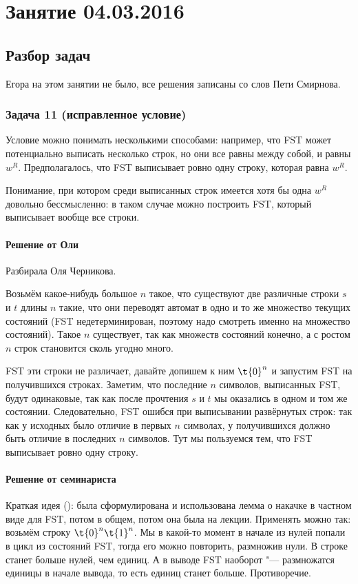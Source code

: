 \chapter{Занятие 04.03.2016}
\section{Разбор задач}

Егора на этом занятии не было, все решения записаны со слов Пети Смирнова.

\subsection{Задача 11 (исправленное условие)}\label{prob11hard}
	\begin{Rem}
		Условие можно понимать несколькими способами: например, что FST может потенциально выписать 
		несколько строк, но они все равны между собой, и равны $w^R$.
		Предполагалось, что FST выписывает ровно одну строку, которая равна $w^R$.

		Понимание, при котором среди выписанных строк имеется хотя бы одна $w^R$ довольно бессмысленно:
		в таком случае можно построить FST, который выписывает вообще все строки.
	\end{Rem}

	\subsubsection{Решение от Оли}
		Разбирала Оля Черникова.

		Возьмём какое-нибудь большое $n$ такое, что существуют две различные строки $s$ и $t$ длины $n$ такие,
		что они переводят автомат в одно и то же множество текущих состояний (FST недетерминирован, поэтому надо смотреть именно на множество состояний).
		Такое $n$ существует, так как множеств состояний конечно, а с ростом $n$ строк становится сколь угодно много.

		FST эти строки не различает, давайте допишем к ним $\t{0}^n$ и запустим FST на получившихся строках.
		Заметим, что последние $n$ символов, выписанных FST, будут одинаковые, так как после прочтения $s$ и $t$
		мы оказались в одном и том же состоянии.
		Следовательно, FST ошибся при выписывании развёрнутых строк: так как у исходных было отличие в первых $n$
		символах, у получившихся должно быть отличие в последних $n$ символов.
		Тут мы пользуемся тем, что FST выписывает ровно одну строку.

	\subsubsection{Решение от семинариста}
		Краткая идея (\TODO):
		была сформулирована и использована лемма о накачке в частном виде для FST, потом в общем, потом она была на лекции.
		Применять можно так: возьмём строку $\t{0}^n\t{1}^n$.
		Мы в какой-то момент в начале из нулей попали в цикл из состояний FST, тогда его можно повторить, размножив нули.
		В строке станет больше нулей, чем единиц.
		А в выводе FST наоборот "--- размножатся единицы в начале вывода, то есть единиц станет больше.
		Противоречие.

